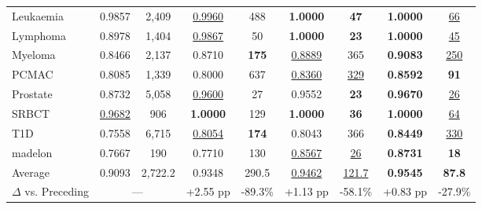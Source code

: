 \begin{table}[!t]
{\begin{tabular}{@{}lcccccccc@{}}
Leukaemia        & 0.9857 & 2{,}409 & \underline{0.9960} & 488 & \textbf{1.0000} & \textbf{47} & \textbf{1.0000} & \underline{66} \\
Lymphoma         & 0.8978 & 1{,}404 & \underline{0.9867} & 50 & \textbf{1.0000} & \textbf{23} & \textbf{1.0000} & \underline{45} \\
Myeloma          & 0.8466 & 2{,}137 & 0.8710 & \textbf{175} & \underline{0.8889} & 365 & \textbf{0.9083} & \underline{250} \\
PCMAC            & 0.8085 & 1{,}339 & 0.8000 & 637 & \underline{0.8360} & \underline{329} & \textbf{0.8592} & \textbf{91} \\
Prostate         & 0.8732 & 5{,}058 & \underline{0.9600} & 27 & 0.9552 & \textbf{23} & \textbf{0.9670} & \underline{26} \\
SRBCT            & \underline{0.9682} & 906 & \textbf{1.0000} & 129 & \textbf{1.0000} & \textbf{36} & \textbf{1.0000} & \underline{64} \\
T1D              & 0.7558 & 6{,}715 & \underline{0.8054} & \textbf{174} & 0.8043 & 366 & \textbf{0.8449} & \underline{330} \\
madelon          & 0.7667 & 190 & 0.7710 & 130 & \underline{0.8567} & \underline{26} & \textbf{0.8731} & \textbf{18} \\
\midrule
Average          & 0.9093 & 2{,}722.2 & 0.9348 & 290.5 & \underline{0.9462} & \underline{121.7} & \textbf{0.9545} & \textbf{87.8} \\
$\Delta$ vs. Preceding & \multicolumn{2}{c}{—} & +2.55 pp & -89.3\% & +1.13 pp & -58.1\% & +0.83 pp & -27.9\% \\
\bottomrule
\end{tabular}%
}
\end{table}